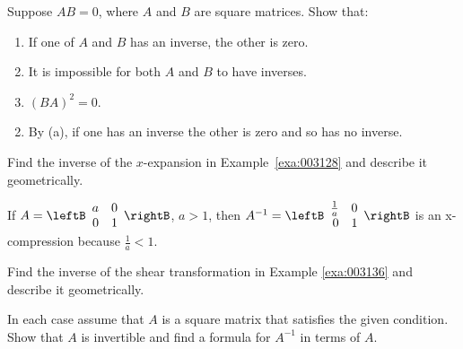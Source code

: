 \begin{multicols}{2}
\begin{ex}
\begin{sol}
\begin{enumerate}[label={\alph*.}]
\end{enumerate}
\end{sol}
\end{ex}

\begin{ex}
Suppose $AB = 0$, where $A$ and $B$ are square matrices. Show that:


\begin{enumerate}[label={\alph*.}]
\item If one of $A$ and $B$ has an inverse, the other is zero.

\item It is impossible for both $A$ and $B$ to have inverses.

\item $(BA)^{2} = 0$.

\end{enumerate}
\begin{sol}
\begin{enumerate}[label={\alph*.}]
\setcounter{enumi}{1}
\item  By (a), if one has an inverse the other is zero and so has no inverse.

\end{enumerate}
\end{sol}
\end{ex}

\begin{ex}
Find the inverse of the $x$-expansion in Example~\ref{exa:003128} and describe it geometrically.

\begin{sol}
If $A = \leftB \begin{array}{rr}
a & 0 \\
0 & 1
\end{array} \rightB$, $a > 1$, then $A^{-1} = \leftB \begin{array}{rr}
 \frac{1}{a} & 0 \\
 0 & 1
 \end{array} \rightB$
 is an x-compression because $\frac{1}{a} < 1$.
\end{sol}
\end{ex}

\begin{ex}
Find the inverse of the shear transformation in Example \ref{exa:003136} and describe it geometrically.
\end{ex}


\begin{ex}
In each case assume that $A$ is a square matrix that satisfies the given condition. Show that $A$ is invertible and find a formula for $A^{-1}$ in terms of $A$.



\end{ex}
\end{multicols}

